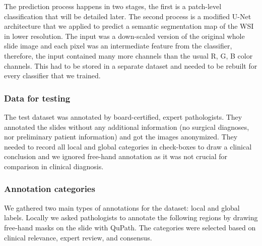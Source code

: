 \documentclass[a4paper,12pt]{article}
\begin{document}
\vspace{7mm}

\par The prediction process happens in two stages, the first is a patch-level classification that will be detailed later. The second process is a modified U-Net \cite{ronneberger2015u} architecture that we applied to predict a semantic segmentation map of the WSI in lower resolution. The input was a down-scaled version of the original whole slide image and each pixel was an intermediate feature from the classifier, therefore, the input contained many more channels than the usual R, G, B color channels. This had to be stored in a separate dataset and needed to be rebuilt for every classifier that we trained.

\vspace{4mm}

\subsubsection{Data for testing}

\vspace{4mm}

\par The test dataset was annotated by board-certified, expert pathologists. They annotated the slides without any additional information (no surgical diagnoses, nor preliminary patient information) and got the images anonymized. They needed to record all local and global categories in check-boxes to draw a clinical conclusion and we ignored free-hand annotation as it was not crucial for comparison in clinical diagnosis. 

\vspace{4mm}

\subsubsection{Annotation categories}

\vspace{4mm}

\par We gathered two main types of annotations for the dataset: local and global labels. Locally we asked pathologists to annotate the following regions by drawing free-hand masks on the slide with QuPath. The categories were selected based on clinical relevance, expert review, and consensus.

\vspace{4mm}
\end{document}
